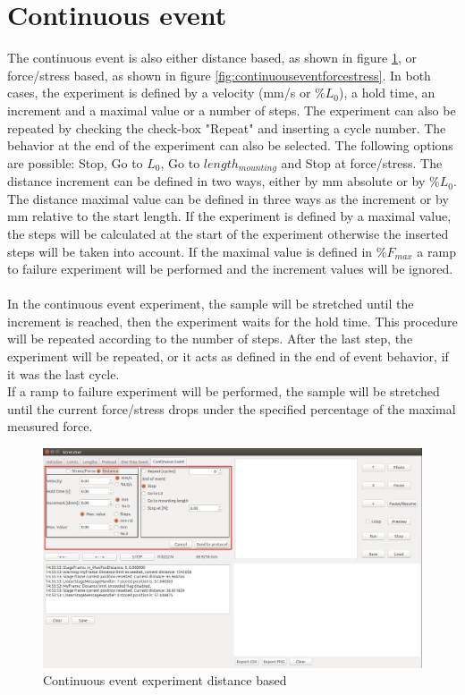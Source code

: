 \section{Continuous event}
The continuous event is also either distance based, as shown in figure \ref{fig:continuouseventdistance}, or force/stress based, as shown in figure \ref{fig:continuouseventforcestress}. In both cases, the experiment is defined by a velocity (mm/s or \(\%L_{0}\)), a hold time, an increment and a maximal value or a number of steps. The experiment can also be repeated by checking the check-box "Repeat" and inserting a cycle number. The behavior at the end of the experiment can also be selected. The following options are possible: Stop, Go to \(L_{0}\), Go to \(length_{mounting}\) and Stop at force/stress. The distance increment can be defined in two ways, either by mm absolute or by \(\%L_{0}\). The distance maximal value can be defined in three ways as the increment or by mm relative to the start length. If the experiment is defined by a maximal value, the steps will be calculated at the start of the experiment otherwise the inserted steps will be taken into account. If the maximal value is defined in \(\%F_{max}\) a ramp to failure experiment will be performed and the increment values will be ignored.
\\
\\
In the continuous event experiment, the sample will be stretched until the increment is reached, then the experiment waits for the hold time. This procedure will be repeated according to the number of steps. After the last step, the experiment will be repeated, or it acts as defined in the end of event behavior, if it was the last cycle.
\\
If a ramp to failure experiment will be performed, the sample will be stretched until the current force/stress drops under the specified percentage of the maximal measured force.

\begin{figure}[!ht]
	\centering
		\includegraphics[width=1.0\textwidth]{images/ContinuousEventDistance}
	\caption{Continuous event experiment distance based}
	\label{fig:continuouseventdistance}
\end{figure}

